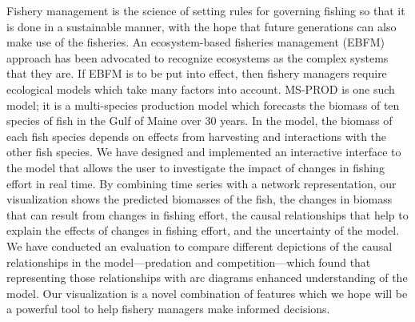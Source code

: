 \begin{abstractpage} 

Fishery management is the science of setting rules for governing fishing so that it is done in a sustainable manner, with the hope that future generations can also make use of the fisheries.  An ecosystem-based fisheries management (EBFM) approach has been advocated to recognize ecosystems as the complex systems that they are.  If EBFM is to be put into effect, then fishery managers require ecological models which take many factors into account. MS-PROD is one such model; it is a multi-species production model which forecasts the biomass of ten species of fish in the Gulf of Maine over 30 years.  In the model, the biomass of each fish species depends on effects from harvesting and interactions with the other fish species.  We have designed and implemented an interactive interface to the model that allows the user to investigate the impact of changes in fishing effort in real time.  By combining time series with a network representation, our visualization shows the predicted biomasses of the fish, the changes in biomass that can result from changes in fishing effort, the causal relationships that help to explain the effects of changes in fishing effort, and the uncertainty of the model.  We have conducted an evaluation to compare different depictions of the causal relationships in the model---predation and competition---which found that representing those relationships with arc diagrams enhanced understanding of the model.  Our visualization is a novel combination of features which we hope will be a powerful tool to help fishery managers make informed decisions.

\end{abstractpage}
